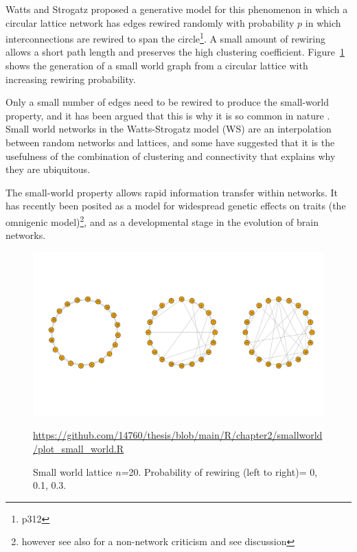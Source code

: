 Watts and Strogatz\cite{watts1998collective} proposed a generative model for this phenomenon in which  a circular lattice network has edges rewired randomly with probability $p$ in which interconnections are rewired to span the circle\cite{newman2018networks}\footnote{p312}. A small amount of rewiring allows a short path length and preserves the high clustering coefficient. Figure~\ref{fig:small_world} shows the generation of a small world graph from a circular lattice with increasing rewiring probability.

Only a small number of edges need to be rewired to produce the small-world property, and it has been argued that this is why it is so common in nature \cite{newman2018networks}. Small world networks in the Watts-Strogatz model (WS) are an interpolation between random networks and lattices, and some have suggested that it is the usefulness of the combination of clustering and connectivity\cite{latora2001efficient} that explains why they are ubiquitous.

The small-world property allows rapid information transfer within networks. It has recently been posited as a model for widespread genetic effects on traits (the omnigenic model)\cite{boyle2017expanded}\footnote{however see also \cite{wray2018common} for a non-network criticism and see discussion}, and as a developmental stage in the evolution of brain networks\cite{vertes2015annual}.




\begin{figure}
    \centering
    \includegraphics[width=\textwidth]{images/Rplot_corrected_small_world.png}
    \caption[Small world lattice]{Small world lattice $n$=20. Probability of rewiring (left to right)= 0, 0.1, 0.3.}
    
    \tiny\url{https://github.com/14760/thesis/blob/main/R/chapter2/smallworld/plot_small_world.R}
    \label{fig:small_world}
\end{figure}

